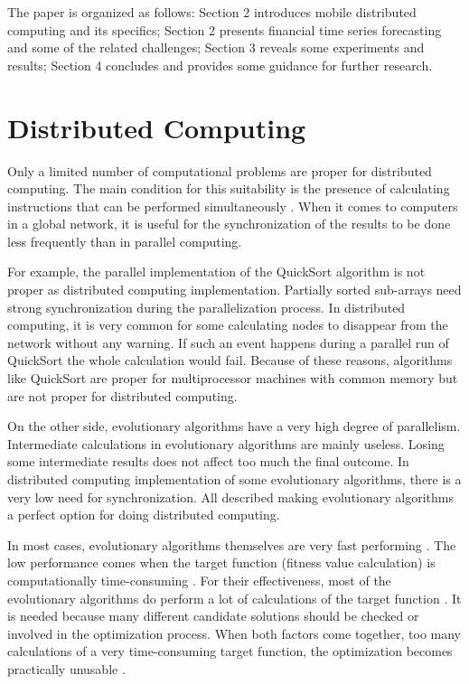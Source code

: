\documentclass[conference]{IEEEtran}
\begin{document}
The paper is organized as follows: Section 2 introduces mobile distributed computing and its specifics; Section 2 presents financial time series forecasting and some of the related challenges; Section 3 reveals some experiments and results; Section 4 concludes and provides some guidance for further research.

\section{Distributed Computing}

Only a limited number of computational problems are proper for distributed computing. The main condition for this suitability is the presence of calculating instructions that can be performed simultaneously \cite{Hillis-1986-a}. When it comes to computers in a global network, it is useful for the synchronization of the results to be done less frequently than in parallel computing. 

For example, the parallel implementation of the QuickSort \cite{Sanders-1997-a} algorithm is not proper as distributed computing implementation. Partially sorted sub-arrays need strong synchronization during the parallelization process. In distributed computing, it is very common for some calculating nodes to disappear from the network without any warning. If such an event happens during a parallel run of QuickSort the whole calculation would fail. Because of these reasons, algorithms like QuickSort are proper for multiprocessor machines with common memory but are not proper for distributed computing. 

On the other side, evolutionary algorithms \cite{Sudholt-2015-a} have a very high degree of parallelism. Intermediate calculations in evolutionary algorithms are mainly useless. Losing some intermediate results does not affect too much the final outcome. In distributed computing implementation of some evolutionary algorithms, there is a very low need for synchronization. All described making evolutionary algorithms a perfect option for doing distributed computing. 

In most cases, evolutionary algorithms themselves are very fast performing \cite{Vural-2012-a}. The low performance comes when the target function (fitness value calculation) is computationally time-consuming \cite{Di-Pietro-2004-a}. For their effectiveness, most of the evolutionary algorithms do perform a lot of calculations of the target function  \cite{Shi-2010-a}. It is needed because many different candidate solutions should be checked or involved in the optimization process. When both factors come together, too many calculations of a very time-consuming target function, the optimization becomes practically unusable \cite{Lee-2015-a}. 
\end{document}
